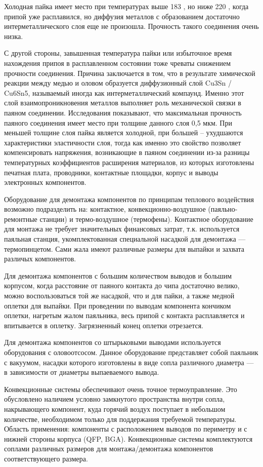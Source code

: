 \documentclass[unicode, 12pt, a4paper, oneside]{article}
\begin{document}
Холодная пайка имеет место при температурах выше 183 \textcelsius, но ниже 220 \textcelsius, когда припой уже расплавился, но диффузия металлов с образованием достаточно интерметаллического слоя еще не произошла. Прочность такого соединения очень низка.

С другой стороны, завышенная температура пайки или избыточное время нахождения припоя в расплавленном состоянии тоже чреваты снижением прочности соединения. Причина заключается в том, что в результате химической реакции между медью и оловом образуется диффузионный слой Cu3Sn / Cu6Sn5, называемый иногда как  интерметаллический  компаунд. Именно этот слой взаимопроникновения металлов выполняет роль механической связки в паяном соединении. Исследования показывают, что максимальная прочность паяного соединения имеет место при толщине данного слоя 0,5 мкм. При меньшей толщине слоя пайка является холодной, при большей – ухудшаются характеристики эластичности слоя, тогда как именно это свойство позволяет компенсировать напряжения, возникающие в паяном соединении из-за разницы температурных коэффициентов расширения материалов, из которых изготовлены печатная плата, проводники, контактные площадки, корпус и выводы электронных   компонентов.

Оборудование для демонтажа компонентов по принципам теплового воздействия возможно подразделить на: контактное, конвекционно-воздушное (паяльно-ремонтные станции) и термо-воздушное (термофены).
Контактное оборудование для монтажа не требует значительных финансовых затрат, т.к. используется паяльная станция, укомплектованная специальной насадкой для демонтажа — термопинцетом. Сами жала имеют различные размеры для выпайки и захвата различых компонентов.

Для демонтажа компонентов с большим количеством выводов и большим корпусом, когда расстояние от паяного контакта до чипа достаточно велико, можно воспользоваться той же насадкой, что и для пайки, а также медной оплетки для выпайки. При проведении по выводам компонента кончиком оплетки, нагретым жалом паяльника, весь припой с контакта расплавляется и впитывается в оплетку. Загрязненный конец оплетки отрезается.

Для демонтажа компонентов со штырьковыми выводами используется оборудования с оловоотсосом. Данное оборудование представляет собой паяльник с вакуумом, насадки которого изготовлены в виде сопла различного диаметра — в зависимости от диаметры выпаеваемого вывода.

Конвекционные системы обеспечивают очень точное термоуправление. Это обусловлено наличием условно замкнутого пространства внутри сопла, накрывающего компонент, куда горячий воздух поступает в небольшом количестве, необходимом только для поддержания требуемой температуры. Область применения: компоненты с расположением выводов по периметру и с нижней стороны корпуса (QFP, BGA). Конвекционные системы комплектуются соплами различных размеров для монтажа/демонтажа компонентов соответствующего размера.
\end{document}
